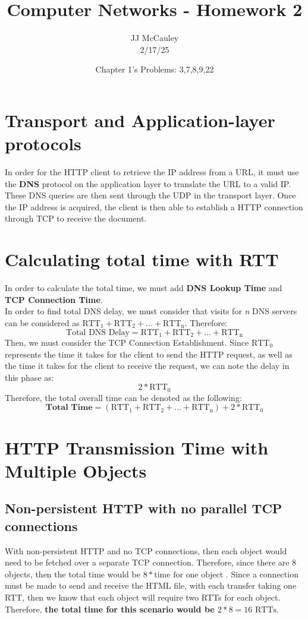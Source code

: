 \documentclass{article}
\title{Computer Networks - Homework 2}
\author{JJ McCauley \\ 2/17/25}
\date{Chapter 1's Problems: 3,7,8,9,22}
\begin{document}
\maketitle


\setcounter{section}{2}
\section{Transport and Application-layer protocols}
In order for the HTTP client to retrieve the IP address from a URL, it must use the \textbf{DNS} protocol on the application layer to translate the URL to a valid IP. These DNS queries are then sent through the UDP in the transport layer. Once the IP address is acquired, the client is then able to establish a HTTP connection through TCP to receive the document.

\setcounter{section}{6}
\section{Calculating total time with RTT}
In order to calculate the total time, we must add \textbf{DNS Lookup Time} and \textbf{TCP Connection Time}. \\
In order to find total DNS delay, we must consider that visits for \textit{n} DNS servers can be considered as $\text{RTT}_{\text{1}} + \text{RTT}_{\text{2}} + ... + \text{RTT}_{\text{n}}$. Therefore:
\[
\text{Total DNS Delay} = \text{RTT}_{\text{1}} + \text{RTT}_{\text{2}} + ... + \text{RTT}_{\text{n}}
\]
Then, we must consider the TCP Connection Establishment. Since $\text{RTT}_{\text{0}}$ represents the time it takes for the client to send the HTTP request, as well as the time it takes for the client to receive the request, we can note the delay in this phase as:
\[
2 * \text{RTT}_{\text{0}}
\]
Therefore, the total overall time can be denoted as the following:
\[
\textbf{Total Time} = (\text{RTT}_{\text{1}} + \text{RTT}_{\text{2}} + ... + \text{RTT}_{\text{n}}) + 2 * \text{RTT}_{\text{0}}
\]

\section{HTTP Transmission Time with Multiple Objects}
\subsection{Non-persistent HTTP with no parallel TCP connections}
With non-persistent HTTP and no TCP connections, then each object would need to be fetched over a separate TCP connection. Therefore, since there are 8 objects, then the total time would be $8 * \text{time for one object}$ .
Since a connection must be made to send and receive the HTML file, with each transfer taking one RTT, then we know that each object will require two RTTs for each object. Therefore, \textbf{the total time for this scenario would be $2 * 8 = 16 \text{ RTTs}$}.
\end{document}
